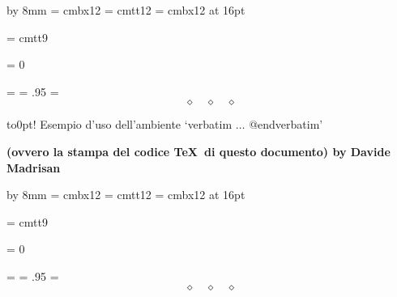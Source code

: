 %

\advance\hoffset by 8mm \nopagenumbers
\font\twelvebf = cmbx12 \font\twelvett = cmtt12 \font\bigbf = cmbx12 at 16pt


\font\verbatimfont = cmtt9 % font typewriter (famiglia \tt), dim. 9pt
\def\\{\char92}
% 

\newcount\linenum\linenum = 0 %
\def\newline{%
    \advance\linenum by 1
    \endgraf\noindent\leavevmode\llap{\sevenrm\the\linenum.\ \ }}

\everyverbatimbegin = {%
    \verbatimbaselineskip = .95\baselineskip}
\everyverbatimend = {$$\diamond\quad\diamond\quad\diamond$$\vskip6mm}

\noindent \raise-1.4pt\hbox to0pt{\hss\bigbf!\hskip2.4mm}%
    {\twelvebf Esempio d'uso dell'ambiente}
   `{\twelvett\\verbatim $\dots$ @endverbatim}' \par
\smallskip
\noindent \bf (ovvero la stampa del codice \TeX\ di questo documento)
\medskip
\noindent by Davide Madrisan 
\vskip12mm

\verbatim
\advance\hoffset by 8mm \nopagenumbers
\font\twelvebf = cmbx12 \font\twelvett = cmtt12 \font\bigbf = cmbx12 at 16pt


\font\verbatimfont = cmtt9 % font typewriter (famiglia \tt), dim. 9pt
\def\\{\char92}

\newcount\linenum\linenum = 0 %
\def\newline{%
    \advance\linenum by 1
    \endgraf\noindent\leavevmode\llap{\sevenrm\the\linenum.\ \ }}

\everyverbatimbegin = {%
    \verbatimbaselineskip = .95\baselineskip}
\everyverbatimend = {$$\diamond\quad\diamond\quad\diamond$$\vskip6mm}

